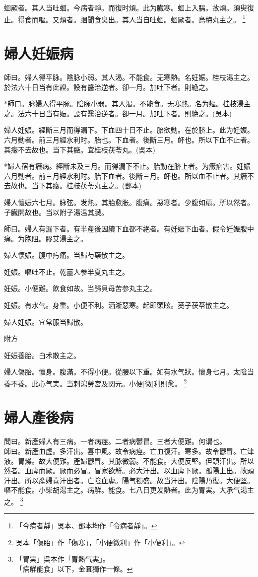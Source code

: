\documentclass[12pt,twoside,UTF8,b5paper]{ctexbook}
\begin{document}
蛔厥者。其人当吐蛔。今病者靜。而復时煩。此为臓寒。蛔上入膈。故煩。須臾復止。得食而嘔。又煩者。蛔聞食臭出。其人当自吐蛔。蛔厥者。烏梅丸主之。
	\footnote{「今病者靜」吳本、鄧本均作「令病者靜」。}

\chapter{婦人妊娠病}

師曰。婦人得平脉。陰脉小弱。其人渴。不能食。无寒熱。名妊娠。桂枝湯主之。於法六十日当有此證。設有醫治逆者。卻一月。加吐下者。則絶之。

*師曰。脉婦人得平脉。陰脉小弱。其人渴。不能食。无寒熱。名为軀。桂枝湯主之。法六十日当有娠。設有醫治逆者。卻一月。加吐下者。則絶之。(吳本)

婦人妊娠。經斷三月而得漏下。下血四十日不止。胎欲動。在於脐上。此为妊娠。六月動者。前三月經水利时。胎也。下血者。後斷三月。衃也。所以下血不止者。其癥不去故也。当下其癥。宜桂枝茯苓丸。(吳本)

*婦人宿有癥病。經斷未及三月。而得漏下不止。胎動在脐上者。为癥痼害。妊娠六月動者。前三月經水利时。胎下血者。後斷三月。衃也。所以血不止者。其癥不去故也。当下其癥。桂枝茯苓丸主之。(鄧本)

婦人懷娠六七月。脉弦。发熱。其胎愈胀。腹痛。惡寒者。少腹如扇。所以然者。子臓開故也。当以附子湯温其臓。

師曰。婦人有漏下者。有半產後因續下血都不絶者。有妊娠下血者。假令妊娠腹中痛。为胞阻。膠艾湯主之。

婦人懷娠。腹中㽲痛。当歸芍藥散主之。

妊娠。嘔吐不止。乾薑人参半夏丸主之。

妊娠。小便難。飲食如故。当歸貝母苦参丸主之。

妊娠。有水气。身重。小便不利。洒淅惡寒。起即頭眩。葵子茯苓散主之。

婦人妊娠。宜常服当歸散。

附方

妊娠養胎。白术散主之。

婦人傷胎。懷身。腹滿。不得小便。從腰以下重。如有水气狀。懷身七月。太陰当養不養。此心气実。当刺瀉勞宮及関元。小便[微]利則愈。
	\footnote{吳本「傷胎」作「傷寒」，「小便微利」作「小便利」。}

\chapter{婦人產後病}

問曰。新產婦人有三病。一者病痙。二者病鬱冒。三者大便難。何谓也。\\
師曰。新產血虗。多汗出。喜中風。故令病痙。亡血復汗。寒多。故令鬱冒。亡津液。胃燥。故大便難。產婦鬱冒。其脉微弱。不能食。大便反堅。但頭汗出。所以然者。血虗而厥。厥而必冒。冒家欲觧。必大汗出。以血虗下厥。孤陽上出。故頭汗出。所以產婦喜汗出者。亡陰血虗。陽气獨盛。故当汗出。陰陽乃復。大便堅。嘔不能食。小柴胡湯主之。病觧。能食。七八日更发熱者。此为胃実。大承气湯主之。
	\footnote{「胃実」吳本作「胃熱气実」。\\「病觧能食」以下，金匱獨作一條。}
\end{document}
